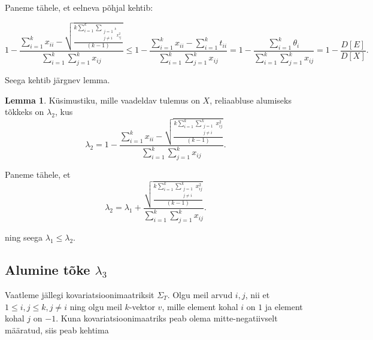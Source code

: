 \documentclass[a4paper,12pt,oneside]{article}
\newcounter{lemma}[section]
\numberwithin{equation}{section}
\theoremstyle{definition}
\newtheorem{lambda_2}[lemma]{Lemma}
\begin{document}
Paneme tähele, et eelneva põhjal kehtib:


\begin{equation*}
 1 - \frac{\sum \limits_{i=1}^k x_{ii} - \sqrt{\frac{ k \sum \limits_{i=1}^k   \sum \limits_{\substack{j=1 \\ j \neq i}^{k} x_{ij}^2 }}{\left( k -1 \right)}}}{\sum \limits_{i=1}^k \sum \limits_{j=1}^k x_{ij}} \leq 1 - \frac{\sum \limits_{i=1}^k x_{ii}- \sum \limits_{i=1}^k t_{ii}}{\sum \limits_{i=1}^k \sum \limits_{j=1}^k x_{ij}} =   1 - \frac{\sum \limits_{i=1}^k \theta_i}{\sum \limits_{i=1}^k \sum \limits_{j=1}^k x_{ij}} =  1 - \frac{D \left[ E \right]}{D \left[ X \right]} \text{.}
\end{equation*}


Seega kehtib järgnev  lemma.

\vspace{10pt}

\begin{lambda_2}
Küsimustiku, mille vaadeldav tulemus on $X$, reliaabluse alumiseks tõkkeks on $\lambda_2$, kus 
\begin{equation*}
\lambda_2 = 1 - \frac{\sum \limits_{i=1}^k x_{ii} - \sqrt{\frac{ k \sum \limits_{i=1}^k   \sum \limits_{\substack{j=1 \\ j \neq i}}^{k} x_{ij}^2 }{\left( k -1 \right)}}}{\sum \limits_{i=1}^k \sum \limits_{j=1}^k x_{ij}}  \text{.}
\end{equation*}
\end{lambda_2}



Paneme tähele, et 
\begin{equation*}
\lambda_2 = \lambda_1 + \frac{\sqrt{\frac{ k \sum \limits_{i=1}^k   \sum \limits_{\substack{j=1 \\j \neq i}}^{k} x_{ij}^2 }{\left( k -1 \right)}}}{\sum \limits_{i=1}^k \sum \limits_{j=1}^k x_{ij}} \text{.}
\end{equation*}

ning seega $\lambda_1 \leq \lambda_2$.

\subsection{Alumine tõke $\lambda_3$}



Vaatleme jällegi kovariatsioonimaatriksit $\Sigma_T$. Olgu meil arvud $i,j$, nii et $1 \leq i,j  \leq k, j \neq i$ ning olgu meil $k$-vektor $v$, mille element kohal $i$ on $1$ ja element kohal $j$ on $-1$. Kuna kovariatsioonimaatriks peab olema mitte-negatiivselt määratud, siis peab kehtima
\end{document}
